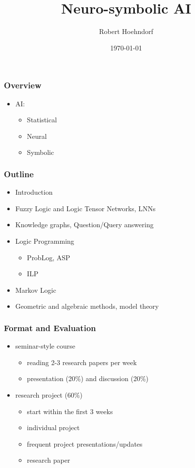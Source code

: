 \documentclass{beamer}
\title{Neuro-symbolic AI}
\author{Robert Hoehndorf}
\date{\today}
\begin{document}
\frame{\titlepage}

\begin{frame}
\frametitle{Overview}
\begin{itemize}
\item AI:
  \begin{itemize}
  \item Statistical
  \item Neural
  \item Symbolic
  \end{itemize}
\end{itemize}
\end{frame}

\begin{frame}
  \frametitle{Outline}
  \begin{itemize}
  \item Introduction
  \item Fuzzy Logic and Logic Tensor Networks, LNNs
  \item Knowledge graphs, Question/Query answering
  \item Logic Programming
    \begin{itemize}
    \item ProbLog, ASP
    \item ILP
    \end{itemize}
  \item Markov Logic
  \item Geometric and algebraic methods, model theory
  \end{itemize}
\end{frame}

\begin{frame}
  \frametitle{Format and Evaluation}
  \begin{itemize}
  \item seminar-style course
    \begin{itemize}
    \item reading 2-3 research papers per week
    \item presentation (20\%) and discussion (20\%)
    \end{itemize}
  \item research project (60\%)
    \begin{itemize}
    \item start within the first 3 weeks
    \item individual project
    \item frequent project presentations/updates
    \item research paper
    \end{itemize}
  \end{itemize}
\end{frame}
\end{document}
